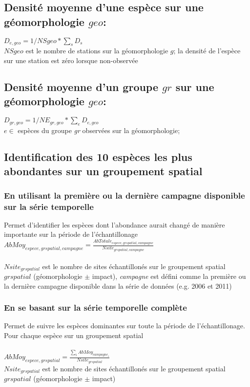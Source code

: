 \documentclass{article}
\begin{document}
\subsection{Densité moyenne d'une espèce sur une géomorphologie $geo$:}
$\displaystyle D_{e, geo} = 1/NSgeo * \sum_s D_s$ \\
$NSgeo$ est le nombre de stations sur la géomorphologie $g$; la densité de
l'espèce sur une station est zéro lorsque non-observée

\subsection{Densité moyenne d'un groupe $gr$ sur une
  géomorphologie $geo$:}
$\displaystyle D_{gr, geo} = 1/NE_{gr,geo} *\sum_e D_{e, geo}$ \\
$ e {} \in $ espèces du groupe \emph{gr} observées sur la géomorphologie; 

\subsection{Identification des 10 espèces les plus abondantes sur
  un groupement spatial}

\subsubsection{En utilisant la première ou la dernière campagne
  disponible sur la série temporelle}

Permet d'identifier les espèces dont l'abondance aurait changé
  de manière importante sur la période de l'échantillonage \\

$ \displaystyle AbMoy_{espece, grspatial, campagne} = \frac{AbTotale_{espece, grspatial,
    campagne}}{Nsite_{grspatial, campagne}}$ \\
\\
$Nsite_{grspatial}$ est le nombre de sites échantillonés sur le
groupement spatial $grspatial$ (géomorphologie $\pm$ impact),
\emph{campagne} est défini comme la première ou la dernière campagne
disponible dans la série de données (e.g. 2006 et 2011)

\subsubsection{En se basant sur la série temporelle complète}
Permet de suivre les espèces dominantes sur toute la période de
l'échantillonage.  Pour chaque espèce sur un groupement spatial \\
\\
$\displaystyle AbMoy_{espece,grspatial} = \frac{\sum_i AbMoy_{campagne_i} }{Nsite_{grspatial}}$ \\
$Nsite_{grspatial}$ est le nombre de sites échantillonés sur le
groupement spatial $grspatial$ (géomorphologie $\pm$ impact)
\end{document}
